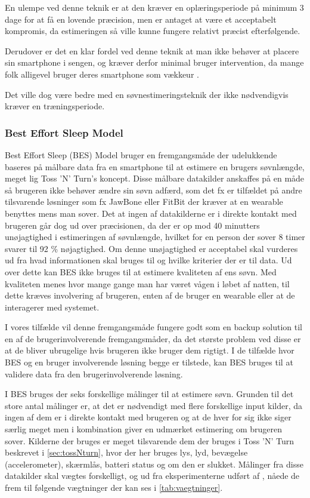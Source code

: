 En ulempe ved denne teknik er at den kræver en oplæringsperiode på minimum 3 dage for at få en lovende præcision, men er antaget at være et acceptabelt kompromis, da estimeringen så ville kunne fungere relativt præcist efterfølgende.

Derudover er det en klar fordel ved denne teknik at man ikke behøver at placere sin smartphone i sengen, og kræver derfor minimal bruger intervention, da mange folk alligevel bruger deres smartphone som vækkeur \citep{misc:phoneAlarmClock}.

Det ville dog være bedre med en søvnestimeringsteknik der ikke nødvendigvis kræver en træningsperiode.

\subsubsection{Best Effort Sleep Model}\label{sec:BES}
Best Effort Sleep (BES) Model \citet{6563918} bruger en fremgangsmåde der udelukkende baseres på målbare data fra en smartphone til at estimere en brugers søvnlængde, meget lig Toss 'N' Turn's koncept.
Disse målbare datakilder anskaffes på en måde så brugeren ikke behøver ændre sin søvn adfærd, som det fx er tilfældet på andre tilsvarende løsninger som fx JawBone eller FitBit der kræver at en wearable benyttes mens man sover.
Det at ingen af datakilderne er i direkte kontakt med brugeren går dog ud over præcisionen, da der er op mod 40 minutters unøjagtighed i estimeringen af søvnlængde, hvilket for en person der sover 8 timer svarer til 92 \% nøjagtighed.
Om denne unøjagtighed er acceptabel skal vurderes ud fra hvad informationen skal bruges til og hvilke kriterier der er til data.
Ud over dette kan BES ikke bruges til at estimere kvaliteten af ens søvn.
Med kvaliteten menes hvor mange gange man har været vågen i løbet af natten, til dette kræves involvering af brugeren, enten af de bruger en wearable eller at de interagerer med systemet.

I vores tilfælde vil denne fremgangsmåde fungere godt som en backup solution til en af de brugerinvolverende fremgangsmåder, da det største problem ved disse er at de bliver ubrugelige hvis brugeren ikke bruger dem rigtigt.
I de tilfælde hvor BES og en bruger involverende løsning begge er tilstede, kan BES bruges til at validere data fra den brugerinvolverende løsning. 

I BES bruges der seks forskellige målinger til at estimere søvn.
Grunden til det store antal målinger er, at det er nødvendigt med flere forskellige input kilder, da ingen af dem er i direkte kontakt med brugeren og at de hver for sig ikke siger særlig meget men i kombination giver en udmærket estimering om brugeren sover.
Kilderne der bruges er meget tilsvarende dem der bruges i Toss 'N' Turn beskrevet i \cref{sec:tossNturn}, hvor der her bruges lys, lyd, bevægelse (accelerometer), skærmlås, batteri status og om den er slukket.
Målinger fra disse datakilder skal vægtes forskelligt, og ud fra eksperimenterne udført af \citet{6563918}, nåede de frem til følgende vægtninger der kan ses i \cref{tab:vaegtninger}.

